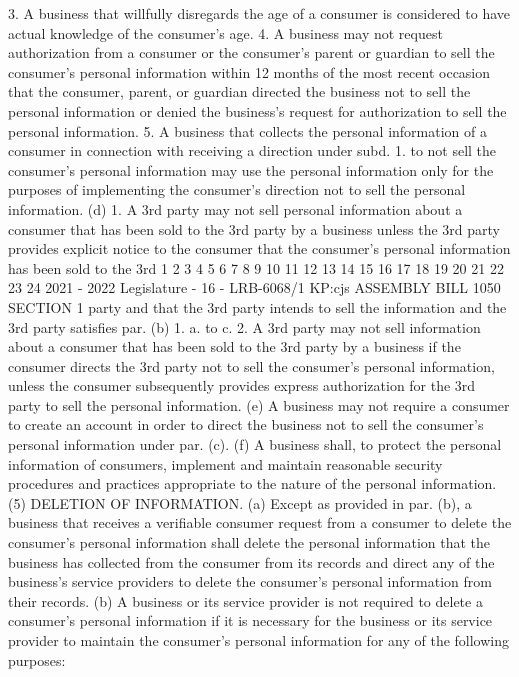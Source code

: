 3. A business that willfully disregards the age of a consumer is considered to
have actual knowledge of the consumer's age.
4. A business may not request authorization from a consumer or the consumer's
parent or guardian to sell the consumer's personal information within 12 months of
the most recent occasion that the consumer, parent, or guardian directed the
business not to sell the personal information or denied the business's request for
authorization to sell the personal information.
5. A business that collects the personal information of a consumer in connection
with receiving a direction under subd. 1. to not sell the consumer's personal
information may use the personal information only for the purposes of implementing
the consumer's direction not to sell the personal information.
(d) 1. A 3rd party may not sell personal information about a consumer that has
been sold to the 3rd party by a business unless the 3rd party provides explicit notice
to the consumer that the consumer's personal information has been sold to the 3rd
1
2
3
4
5
6
7
8
9
10
11
12
13
14
15
16
17
18
19
20
21
22
23
24
2021 - 2022 Legislature - 16 - LRB-6068/1
KP:cjs
 ASSEMBLY BILL 1050 SECTION 1
party and that the 3rd party intends to sell the information and the 3rd party
satisfies par. (b) 1. a. to c.
2. A 3rd party may not sell information about a consumer that has been sold
to the 3rd party by a business if the consumer directs the 3rd party not to sell the
consumer's personal information, unless the consumer subsequently provides
express authorization for the 3rd party to sell the personal information.
(e) A business may not require a consumer to create an account in order to direct
the business not to sell the consumer's personal information under par. (c).
(f) A business shall, to protect the personal information of consumers,
implement and maintain reasonable security procedures and practices appropriate
to the nature of the personal information.
(5) DELETION OF INFORMATION. (a) Except as provided in par. (b), a business that
receives a verifiable consumer request from a consumer to delete the consumer's
personal information shall delete the personal information that the business has
collected from the consumer from its records and direct any of the business's service
providers to delete the consumer's personal information from their records.
(b) A business or its service provider is not required to delete a consumer's
personal information if it is necessary for the business or its service provider to
maintain the consumer's personal information for any of the following purposes:

